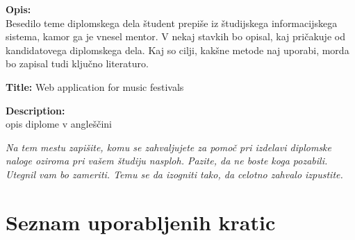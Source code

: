 \documentclass[a4paper,12pt,openright]{book}
\newcommand{\clearemptydoublepage}{\newpage{\pagestyle{empty}\cleardoublepage}}
\begin{document}
\bigskip
\noindent\textbf{Opis:}\\
Besedilo teme diplomskega dela študent prepiše iz študijskega informacijskega sistema, kamor ga je vnesel mentor. 
V nekaj stavkih bo opisal, kaj pričakuje od kandidatovega diplomskega dela. 
Kaj so cilji, kakšne metode naj uporabi, morda bo zapisal tudi ključno literaturo.

\bigskip
\noindent\textbf{Title:} Web application for music festivals

\bigskip
\noindent\textbf{Description:}\\
opis diplome v angleščini

\vfill



\vspace{2cm}

\clearemptydoublepage

\thispagestyle{empty}\mbox{}\vfill\null\it%
\noindent
Na tem mestu zapišite, komu se zahvaljujete za pomoč pri izdelavi diplomske naloge oziroma pri vašem študiju nasploh. Pazite, da ne boste koga pozabili. Utegnil vam bo zameriti. Temu se da izogniti tako, da celotno zahvalo izpustite.
\rm\normalfont

\clearemptydoublepage


\pagestyle{empty}
\def\thepage{}%
\tableofcontents{}


\clearemptydoublepage


\chapter*{Seznam uporabljenih kratic}
\end{document}
